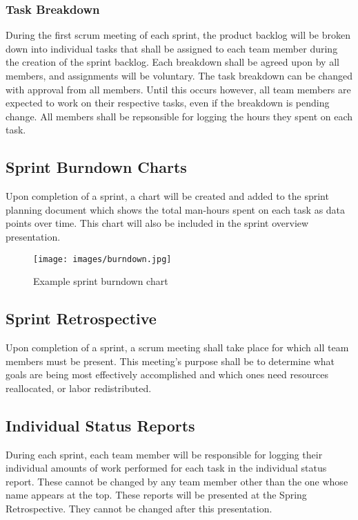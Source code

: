 \subsubsection{Task Breakdown}
During the first scrum meeting of each sprint, the product backlog will be broken down into individual tasks that shall be assigned to each team member during the creation of the sprint backlog. Each breakdown shall be agreed upon by all members, and assignments will be voluntary. The task breakdown can be changed with approval from all members. Until this occurs however, all team members are expected to work on their respective tasks, even if the breakdown is pending change. All members shall be repsonsible for logging the hours they spent on each task.

\subsection{Sprint Burndown Charts}
Upon completion of a sprint, a chart will be created and added to the sprint planning document which shows the total man-hours spent on each task as data points over time. This chart will also be included in the sprint overview presentation.

\begin{figure}[h!]
    \centering
    \texttt{[image: images/burndown.jpg]}
    \caption{Example sprint burndown chart}
\end{figure}

\subsection{Sprint Retrospective}
Upon completion of a sprint, a scrum meeting shall take place for which all team members must be present. This meeting's purpose shall be to determine what goals are being most effectively accomplished and which ones need resources reallocated, or labor redistributed.

\subsection{Individual Status Reports}
During each sprint, each team member will be responsible for logging their individual amounts of work performed for each task in the individual status report. These cannot be changed by any team member other than the one whose name appears at the top. These reports will be presented at the Spring Retrospective. They cannot be changed after this presentation.

